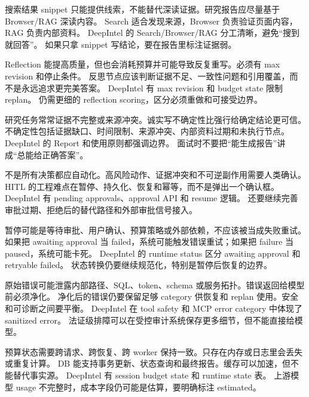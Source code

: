 {搜索结果 snippet 只能提供线索，不能替代深读证据。研究报告应尽量基于 Browser/RAG 深读内容。}
{Search 适合发现来源，Browser 负责验证页面内容，RAG 负责内部资料。}
{DeepIntel 的 Search/Browser/RAG 分工清晰，避免“搜到就回答”。}
{如果只拿 snippet 写结论，要在报告里标注证据弱。}

{Reflection 能提高质量，但也会消耗预算并可能导致反复重写。必须有 max revision 和停止条件。}
{反思节点应该判断证据不足、一致性问题和引用覆盖，而不是永远追求更完美答案。}
{DeepIntel 有 max revision 和 budget state 限制 replan。}
{仍需更细的 reflection scoring，区分必须重做和可接受边界。}

{研究任务常常证据不完整或来源冲突。诚实写不确定性比强行给确定结论更可信。}
{不确定性包括证据缺口、时间限制、来源冲突、内部资料过期和未执行节点。}
{DeepIntel 的 Report 和使用原则都强调边界。}
{面试时不要把“能生成报告”讲成“总能给正确答案”。}

{不是所有决策都应自动化。高风险动作、证据冲突和不可逆副作用需要人类确认。}
{HITL 的工程难点在暂停、持久化、恢复和幂等，而不是弹出一个确认框。}
{DeepIntel 有 pending approvals、approval API 和 resume 逻辑。}
{还要继续完善审批过期、拒绝后的替代路径和外部审批信号接入。}

{暂停可能是等待审批、用户确认、预算策略或外部依赖，不应该被当成失败重试。}
{如果把 awaiting approval 当 failed，系统可能触发错误重试；如果把 failure 当 paused，系统可能卡死。}
{DeepIntel 的 runtime status 区分 awaiting approval 和 retryable failed。}
{状态转换仍要继续规范化，特别是暂停后恢复的边界。}

{原始错误可能泄露内部路径、SQL、token、schema 或服务拓扑。错误返回给模型前必须净化。}
{净化后的错误仍要保留足够 category 供恢复和 replan 使用。安全和可诊断之间要平衡。}
{DeepIntel 在 tool safety 和 MCP error category 中体现了 sanitized error。}
{法证级排障可以在受控审计系统保存更多细节，但不能直接给模型。}

{预算状态需要跨请求、跨恢复、跨 worker 保持一致。只存在内存或日志里会丢失或重复计算。}
{DB 能支持事务更新、状态查询和最终报告。缓存可以加速，但不能替代事实源。}
{DeepIntel 有 session budget state 和 runtime state 表。}
{上游模型 usage 不完整时，成本字段仍可能是估算，要明确标注 estimated。}

